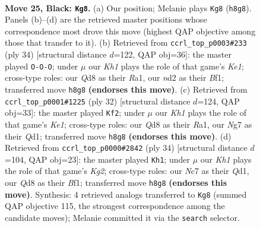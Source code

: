 \documentclass[11pt]{article}
\begin{document}
\begin{figure}[p]
\label{fig:thought-m47}
\end{figure}

\clearpage

\begin{figure}[p]\centering
\begin{subfigure}{0.46\textwidth}\centering
\resizebox{\linewidth}{!}{%
\newchessgame
\chessboard[
  setfen={1rbq3k/p1n2rn1/5bpp/2pp1p2/P4P2/1P4P1/Q2NP1BP/1RBRN1K1 b - - 7 25},
  showmover=false,
  pgfstyle=straightmove, color=movearrow, markmove={h8-g8}
]}
\caption{}
\end{subfigure}\hfill
\begin{subfigure}{0.46\textwidth}\centering
\resizebox{\linewidth}{!}{%
\newchessgame
\chessboard[
  setfen={1rbqnrk1/5pb1/p5p1/3pP2p/3B3P/2N2P2/PP1Q2P1/R3KB1R w KQ - 1 18},
  showmover=false,
  pgfstyle=straightmove, color=movearrow, markmove={e1-c1}
]}
\caption{}
\end{subfigure}
\\[4pt]
\begin{subfigure}{0.46\textwidth}\centering
\resizebox{\linewidth}{!}{%
\newchessgame
\chessboard[
  setfen={2r1k2r/ppq1bppp/4p3/P1npP3/2bN1P2/2P1B3/1PB3PP/R2QK2R w KQk - 1 17},
  showmover=false,
  pgfstyle=straightmove, color=movearrow, markmove={e1-f2}
]}
\caption{}
\end{subfigure}\hfill
\begin{subfigure}{0.46\textwidth}\centering
\resizebox{\linewidth}{!}{%
\newchessgame
\chessboard[
  setfen={r2qk2r/1b1nnpp1/4p2p/p1bpP3/3N1PPP/4B2R/1PP1N1K1/R2Q1B2 w kq - 4 18},
  showmover=false,
  pgfstyle=straightmove, color=movearrow, markmove={g2-h1}
]}
\caption{}
\end{subfigure}
\caption{\textbf{Move 25, Black: \texttt{Kg8}.} (a) Our position; Melanie plays \texttt{Kg8} (\texttt{h8g8}). Panels (b)--(d) are the retrieved master positions whose correspondence most drove this move (highest QAP objective among those that transfer to it). (b) Retrieved from \texttt{ccrl\_top\_p0003\#233} (ply 34) [structural distance $d$=122, QAP obj=36]: the master played \texttt{O-O-O}; under $\mu$ our \emph{Kh1} plays the role of that game's \emph{Ke1}; cross-type roles: our \emph{Q}d8 as their \emph{R}a1, our \emph{n}d2 as their \emph{B}f1; transferred move \texttt{h8g8} \textbf{(endorses this move)}. (c) Retrieved from \texttt{ccrl\_top\_p0001\#1225} (ply 32) [structural distance $d$=124, QAP obj=33]: the master played \texttt{Kf2}; under $\mu$ our \emph{Kh1} plays the role of that game's \emph{Ke1}; cross-type roles: our \emph{Q}d8 as their \emph{R}a1, our \emph{N}g7 as their \emph{Q}d1; transferred move \texttt{h8g8} \textbf{(endorses this move)}. (d) Retrieved from \texttt{ccrl\_top\_p0000\#2842} (ply 34) [structural distance $d$=104, QAP obj=23]: the master played \texttt{Kh1}; under $\mu$ our \emph{Kh1} plays the role of that game's \emph{Kg2}; cross-type roles: our \emph{N}c7 as their \emph{Q}d1, our \emph{Q}d8 as their \emph{B}f1; transferred move \texttt{h8g8} \textbf{(endorses this move)}. Synthesis: 4 retrieved analogs transferred to \texttt{Kg8} (summed QAP objective 115, the strongest correspondence among the candidate moves); Melanie committed it via the \texttt{search} selector.}

\end{figure}
\end{document}

